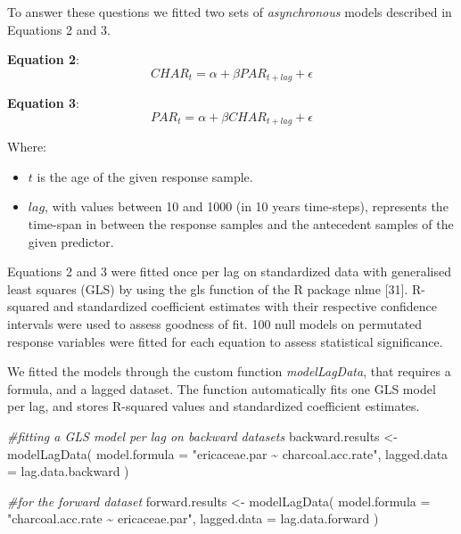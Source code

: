 \documentclass[
]{article}
\newenvironment{Shaded}{\begin{snugshade}}{\end{snugshade}}
\newcommand{\AttributeTok}[1]{\textcolor[rgb]{0.77,0.63,0.00}{#1}}
\newcommand{\CommentTok}[1]{\textcolor[rgb]{0.56,0.35,0.01}{\textit{#1}}}
\newcommand{\FunctionTok}[1]{\textcolor[rgb]{0.00,0.00,0.00}{#1}}
\newcommand{\NormalTok}[1]{#1}
\newcommand{\OtherTok}[1]{\textcolor[rgb]{0.56,0.35,0.01}{#1}}
\newcommand{\StringTok}[1]{\textcolor[rgb]{0.31,0.60,0.02}{#1}}
\providecommand{\tightlist}{%
  \setlength{\itemsep}{0pt}\setlength{\parskip}{0pt}}
\begin{document}
To answer these questions we fitted two sets of \emph{asynchronous}
models described in Equations 2 and 3.

\textbf{Equation 2}:
\[CHAR_{t} = \alpha + \beta PAR_{t+lag} + \epsilon\]

\textbf{Equation 3}:
\[PAR_{t} = \alpha + \beta CHAR_{t+lag} + \epsilon\]

Where:

\begin{itemize}
\tightlist
\item
  \(t\) is the age of the given response sample.
\item
  \(lag\), with values between 10 and 1000 (in 10 years time-steps),
  represents the time-span in between the response samples and the
  antecedent samples of the given predictor.
\end{itemize}

Equations 2 and 3 were fitted once per lag on standardized data with
generalised least squares (GLS) by using the gls function of the R
package nlme {[}31{]}. R-squared and standardized coefficient estimates
with their respective confidence intervals were used to assess goodness
of fit. 100 null models on permutated response variables were fitted for
each equation to assess statistical significance.

We fitted the models through the custom function \emph{modelLagData},
that requires a formula, and a lagged dataset. The function
automatically fits one GLS model per lag, and stores R-squared values
and standardized coefficient estimates.

\small

\begin{Shaded}
\begin{Highlighting}[]
\CommentTok{\#fitting a GLS model per lag on backward datasets}
\NormalTok{backward.results }\OtherTok{\textless{}{-}} \FunctionTok{modelLagData}\NormalTok{(}
  \AttributeTok{model.formula =} \StringTok{"ericaceae.par \textasciitilde{} charcoal.acc.rate"}\NormalTok{, }
  \AttributeTok{lagged.data =}\NormalTok{ lag.data.backward}
\NormalTok{  )}

\CommentTok{\#for the forward dataset}
\NormalTok{forward.results }\OtherTok{\textless{}{-}} \FunctionTok{modelLagData}\NormalTok{(}
  \AttributeTok{model.formula =} \StringTok{"charcoal.acc.rate \textasciitilde{} ericaceae.par"}\NormalTok{, }
  \AttributeTok{lagged.data =}\NormalTok{ lag.data.forward}
\NormalTok{  )}
\end{Highlighting}
\end{Shaded}
\end{document}
